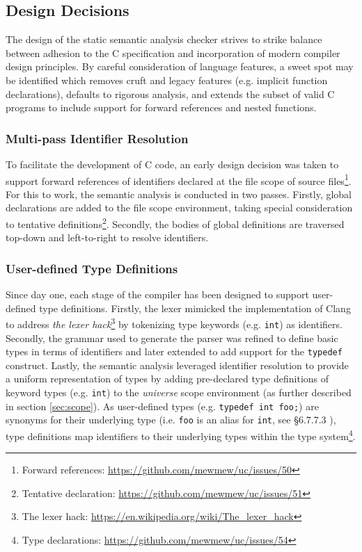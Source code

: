 \subsection{Design Decisions}

The design of the static semantic analysis checker strives to strike balance between adhesion to the C specification and incorporation of modern compiler design principles. By careful consideration of language features, a sweet spot may be identified which removes cruft and legacy features (e.g. implicit function declarations), defaults to rigorous analysis, and extends the subset of valid C programs to include support for forward references and nested functions.

\subsubsection{Multi-pass Identifier Resolution}

To facilitate the development of C code, an early design decision was taken to support forward references of identifiers declared at the file scope of source files\footnote{Forward references: \url{https://github.com/mewmew/uc/issues/50}}. For this to work, the semantic analysis is conducted in two passes. Firstly, global declarations are added to the file scope environment, taking special consideration to tentative definitions\footnote{Tentative declaration: \url{https://github.com/mewmew/uc/issues/51}}. Secondly, the bodies of global definitions are traversed top-down and left-to-right to resolve identifiers.

\subsubsection{User-defined Type Definitions}

Since day one, each stage of the compiler has been designed to support user-defined type definitions. Firstly, the lexer mimicked the implementation of Clang to address \textit{the lexer hack}\footnote{The lexer hack: \url{https://en.wikipedia.org/wiki/The_lexer_hack}} by tokenizing type keywords (e.g. \texttt{int}) as identifiers. Secondly, the grammar used to generate the parser was refined to define basic types in terms of identifiers and later extended to add support for the \texttt{typedef} construct. Lastly, the semantic analysis leveraged identifier resolution to provide a uniform representation of types by adding pre-declared type definitions of keyword types (e.g. \texttt{int}) to the \textit{universe} scope environment (as further described in section \ref{sec:scope}). As user-defined types (e.g. \texttt{typedef int foo;}) are synonyms for their underlying type (i.e. \texttt{foo} is an alias for \texttt{int}, see §6.7.7.3 \cite{c11_spec}), type definitions map identifiers to their underlying types within the type system\footnote{Type declarations: \url{https://github.com/mewmew/uc/issues/54}}.


